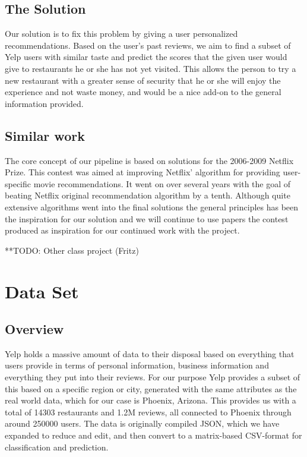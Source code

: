 \documentclass[10pt,twocolumn,letterpaper]{article}
\begin{document}
\subsection{The Solution}
Our solution is to fix this problem by giving a user personalized recommendations. Based on the user's past reviews, we aim to find a subset of Yelp users with similar taste and predict the scores that the given user would give to restaurants he or she has not yet visited. This allows the person to try a new restaurant with a greater sense of security that he or she will enjoy the experience and not waste money, and would be a nice add-on to the general information provided.
\subsection{Similar work}
The core concept of our pipeline is based on solutions for the 2006-2009 Netflix Prize. This contest was aimed at improving Netflix' algorithm for providing user-specific movie recommendations. It went on over several years with the goal of beating Netflix original recommendation algorithm by a tenth. Although quite extensive algorithms went into the final solutions the general principles has been the inspiration for our solution and we will continue to use papers the contest produced as inspiration for our continued work with the project\cite{KorBell}\cite{BellKor}.

**TODO: Other class project (Fritz)


\section{Data Set}

\subsection{Overview}
Yelp holds a massive amount of data to their disposal based on everything that users provide in terms of personal information, business information and everything they put into their reviews. For our purpose Yelp provides a subset of this based on a specific region or city, generated with the same attributes as the real world data, which for our case is Phoenix, Arizona. This provides us with a total of 14303 restaurants and 1.2M reviews, all connected to Phoenix through around 250000 users. The data is originally compiled JSON, which we have expanded to reduce and edit, and then convert to a matrix-based CSV-format for classification and prediction.
\end{document}
